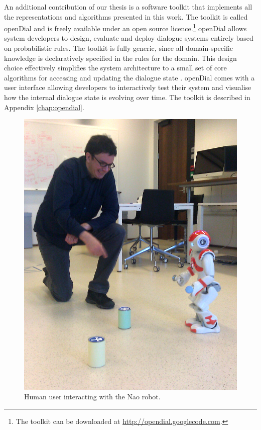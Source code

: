 An additional contribution of our thesis is a software toolkit that implements all the representations and algorithms presented in this work. The toolkit is called \textsf{openDial}
 and is freely available under an open source licence.\footnote{The toolkit can be downloaded at \url{http://opendial.googlecode.com}.} \textsf{openDial} allows system developers to design, evaluate and deploy dialogue systems entirely based on probabilistic rules.  The toolkit is fully generic, since all domain-specific knowledge is declaratively specified in the rules for the domain.  This design choice effectively simplifies the system architecture to a small set of core algorithms for accessing and updating the dialogue state \citep{lison-semdial2012}. \textsf{openDial} comes with a user interface allowing developers to interactively test their system and visualise how the internal dialogue state is evolving over time.  The toolkit is described in Appendix \ref{chap:opendial}. 

\begin{figure}
\begin{center}
\includegraphics[scale=0.10]{imgs/nao1.jpg}
\end{center} 
\caption{Human user interacting with the Nao robot.}
\label{fig:nao}
\end{figure}

